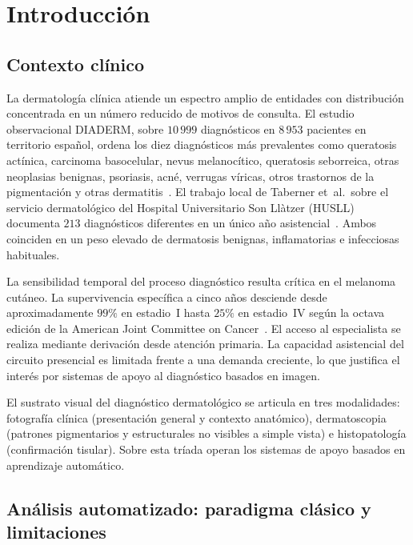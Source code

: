 
\chapter{Introducción}
\label{cap:intro}

\section{Contexto clínico}
\label{sec:contexto}

La dermatología clínica atiende un espectro amplio de entidades con
distribución concentrada en un número reducido de motivos de
consulta. El estudio observacional DIADERM, sobre $10\,999$
diagnósticos en $8\,953$ pacientes en territorio español,
ordena los diez diagnósticos más prevalentes como queratosis
actínica, carcinoma basocelular, nevus melanocítico, queratosis
seborreica, otras neoplasias benignas, psoriasis, acné, verrugas
víricas, otros trastornos de la pigmentación y otras
dermatitis~\cite{diaderm2018}. El trabajo local de Taberner et~al.\
sobre el servicio dermatológico del Hospital Universitario Son
Llàtzer (HUSLL) documenta $213$ diagnósticos diferentes en un
único año asistencial~\cite{taberner2010_motivos}. Ambos coinciden
en un peso elevado de dermatosis benignas, inflamatorias e
infecciosas habituales.

La sensibilidad temporal del proceso diagnóstico resulta crítica en
el melanoma cutáneo. La supervivencia específica a cinco años
desciende desde aproximadamente $99\%$ en estadio~I hasta
$25\%$ en estadio~IV según la octava edición de la American
Joint Committee on Cancer~\cite{ajcc8}. El acceso al especialista
se realiza mediante derivación desde atención primaria. La
capacidad asistencial del circuito presencial es limitada frente a
una demanda creciente, lo que justifica el interés por sistemas de
apoyo al diagnóstico basados en imagen.

El sustrato visual del diagnóstico dermatológico se articula en tres
modalidades: fotografía clínica (presentación general y contexto
anatómico), dermatoscopia (patrones pigmentarios y estructurales no
visibles a simple vista) e histopatología (confirmación
tisular). Sobre esta tríada operan los sistemas de apoyo basados en
aprendizaje automático.

\section{Análisis automatizado: paradigma clásico y limitaciones}
\label{sec:paradigma-clasico}

